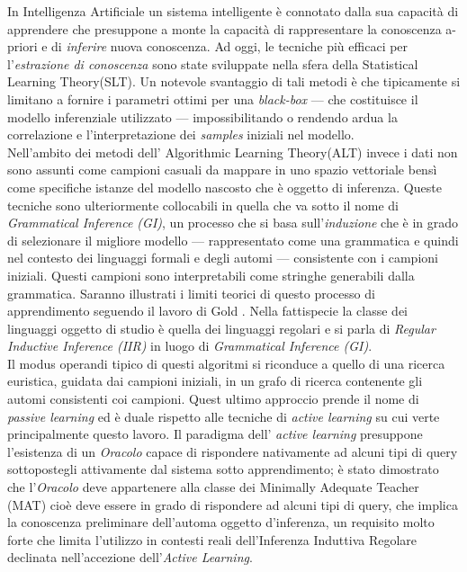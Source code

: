 \label{cap:sommario}
In Intelligenza Artificiale un sistema intelligente è connotato dalla sua capacità di apprendere che presuppone a monte la capacità di rappresentare la conoscenza a-priori e di \textit{inferire} nuova conoscenza.  Ad oggi, le tecniche più efficaci per l'\textit{estrazione di conoscenza}  sono state sviluppate nella sfera della Statistical  Learning Theory(SLT).   Un notevole svantaggio di tali metodi è che tipicamente si limitano a fornire i parametri ottimi per una \textit{black-box} --- che costituisce il modello inferenziale utilizzato --- impossibilitando o rendendo ardua la correlazione e l'interpretazione dei \textit{samples} iniziali nel modello.\\
Nell'ambito dei metodi dell' Algorithmic Learning Theory(ALT) invece i dati non sono assunti come campioni casuali da mappare in uno spazio vettoriale bensì come specifiche istanze del modello nascosto che è oggetto di inferenza.  Queste tecniche sono ulteriormente collocabili in quella che va sotto il nome di \textit{Grammatical Inference (GI)}, un processo che si basa sull'\textit{induzione}  che è in grado di selezionare il migliore modello --- rappresentato come una grammatica e quindi nel contesto dei linguaggi formali e degli automi --- consistente con i campioni iniziali. Questi campioni sono interpretabili come stringhe generabili dalla grammatica. Saranno illustrati i limiti teorici di questo processo di apprendimento seguendo il lavoro di Gold \cite{Gold67}. Nella fattispecie la classe dei linguaggi oggetto di studio è quella dei linguaggi regolari e si parla di \textit{Regular Inductive Inference (IIR)} in luogo di \textit{Grammatical Inference (GI)}.\\
 Il modus operandi tipico di questi algoritmi si riconduce a quello di una ricerca euristica, guidata dai campioni iniziali, in un grafo di ricerca contenente gli automi consistenti coi campioni. Quest ultimo approccio prende il nome di \textit{passive learning} ed è duale rispetto alle tecniche di \textit{active learning} su cui verte principalmente questo lavoro. Il paradigma dell' \textit{active learning} presuppone l'esistenza di un \textit{Oracolo} capace di rispondere nativamente ad alcuni tipi di query sottopostegli attivamente dal sistema sotto apprendimento; è stato dimostrato \cite{Angluin87} che l'\textit{Oracolo} deve appartenere alla classe dei Minimally Adequate Teacher (MAT) cioè deve essere in grado di rispondere ad alcuni tipi di query,  che implica la conoscenza preliminare dell'automa oggetto d'inferenza, un requisito molto forte che limita l'utilizzo in contesti reali dell'Inferenza Induttiva Regolare declinata nell'accezione dell'\textit{Active Learning}.\\  
